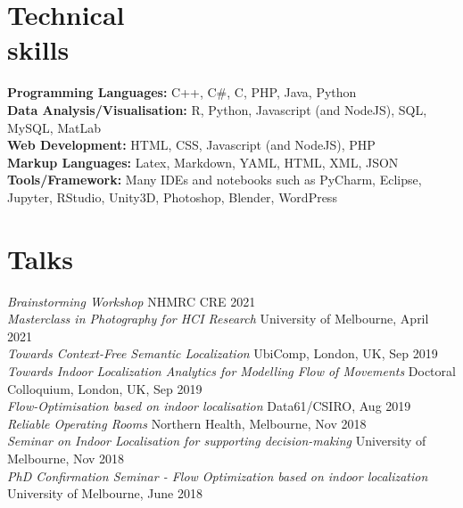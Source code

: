 \documentclass[margin]{res}
\begin{document}
\begin{resume}
\section{Technical\\skills}

\textbf{Programming Languages:} C++, C\#, C, PHP, Java, Python
\\
\textbf{Data Analysis/Visualisation:} R, Python, Javascript (and NodeJS), SQL, MySQL, MatLab
\\
\textbf{Web Development:} HTML, CSS, Javascript (and NodeJS), PHP
\\
\textbf{Markup Languages:} Latex, Markdown, YAML, HTML, XML, JSON
\\
\textbf{Tools/Framework:} Many IDEs and notebooks such as PyCharm, Eclipse, Jupyter, RStudio, Unity3D, Photoshop, Blender, WordPress


\section{Talks}
\par
\textbullet{} \textit{Brainstorming Workshop} \hfill{NHMRC CRE 2021}\\
\textbullet{} \textit{Masterclass in Photography for HCI Research} \hfill{University of Melbourne, April 2021}\\
\textbullet{} \textit{Towards Context-Free Semantic Localization} \hfill{UbiComp, London, UK, Sep 2019}\\
\textbullet{} \textit{Towards Indoor Localization Analytics for Modelling Flow of Movements} \hfill{\UbiComp Doctoral Colloquium, London, UK, Sep 2019}\\
\textbullet{} \textit{Flow-Optimisation based on indoor localisation} \hfill{Data61/CSIRO, Aug 2019}\\
\textbullet{} \textit{Reliable Operating Rooms} \hfill{Northern Health, Melbourne, Nov 2018}\\
\textbullet{} \textit{Seminar on Indoor Localisation for supporting decision-making} \hfill{University of Melbourne, Nov 2018}\\
\textbullet{} \textit{PhD Confirmation Seminar - Flow Optimization based on indoor localization} \hfill{University of Melbourne, June 2018}\\



\end{resume}
\end{document}
